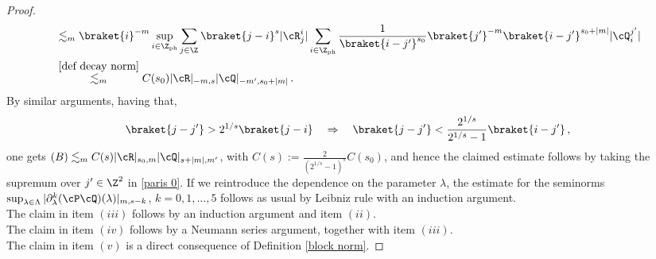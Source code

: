 \documentclass[a4paper,reqno,10pt]{article}
\newcommand{\pa}{\partial}
\begin{document}
\begin{proof}
\begin{align}
    & \lesssim_{m} \braket{i}^{-m} \sup_{i\in\Z_{\rm ph}}\sum_{j\in\Z_{\rm}}\braket{j-i}^{s} |\cR_{j}^{i}| \sum_{i\in\Z_{\rm ph}}\frac{1}{\braket{i-j'}^{s_{0}}}  \braket{j'}^{-m}\braket{i-j'}^{s_{0}+|m|} |\cQ_{i}^{j'}| \\
    & \stackrel{\eqref{def decay norm}}{\lesssim_{m}}C(s_{0}) |\cR|_{-m,s} |\cQ|_{-m',s_{0}+|m|}\,.
\end{align}
By similar arguments, having that,
\begin{equation}
     \braket{j-j'}> 2^{1/s}\braket{j-i} \quad \Rightarrow \quad \braket{j-j'} < \frac{2^{1/s}}{2^{1/s}-1} \braket{i-j'}\,,
\end{equation}
one gets $(B) \lesssim_m C(s)|\cR|_{s_{0}, m}|\cQ|_{s + |m|, m'} $, with $C(s):= \frac{2}{(2^{1/s}-1)^s}C(s_{0})$, and hence the claimed estimate follows by taking the supremum over $j' \in \Z^2$ in \eqref{paris 0}. If we reintroduce the dependence on the parameter $\lambda$, the  estimate for the seminorms $\sup_{\lambda\in\Lambda}|\pa_{\lambda}^k(\cP\cQ)(\lambda)|_{m,s-k}$, $k=0,1,...,5$ follows as usual by Leibniz rule with an induction argument.
\\[1mm]
\noindent
The claim in item $(iii)$ follows by an induction argument and item $(ii)$.
\\[1mm]
\noindent  The claim in item $(iv)$ follows by a Neumann series argument, together with item $(iii)$.
\\[1mm]
\noindent The claim in item $(v)$ is a direct consequence of Definition \ref{block norm}.
\end{proof}
\end{document}
